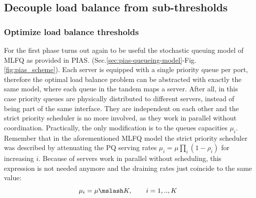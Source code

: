 \subsection{Decouple load balance from sub-thresholds}
\label{sec:decoupling}
\subsubsection{Optimize load balance thresholds}
For the first phase turns out again to be useful the stochastic queuing model of MLFQ as provided in PIAS. (Sec.\ref{sec:pias-queueing-model}-Fig.\ref{fig:pias_scheme}). Each server is equipped with a single priority queue per port, therefore the optimal load balance problem can be abstracted with exactly the same model, where each queue in the tandem maps a server. After all, in this case priority queues are physically distributed to different servers, instead of being part of the same interface. They are independent on each other and the strict priority scheduler is no more involved, as they work in parallel without coordination. Practically, the only modification is to the queues capacities $\mu_i$. Remember that in the aforementioned MLFQ model the strict priority scheduler was described by attenuating the PQ serving rates $\mu_i = \mu\prod_{i}(1-\rho_i)$ for increasing $i$. Because of servers work in parallel without scheduling, this expression is not needed anymore and the draining rates just coincide to the same value:
\[
\mu_i = \mu \mslash K, \qquad i=1,..,K
\]
